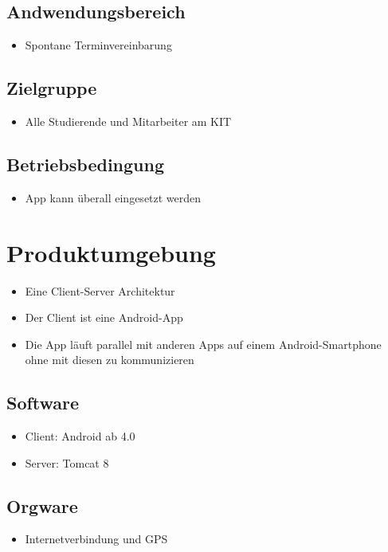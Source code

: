 \documentclass{scrartcl}
\begin{document}
	\subsection{Andwendungsbereich}
		\begin{itemize}	        
		\item Spontane Terminvereinbarung 
		\end{itemize}
		\subsection{Zielgruppe}
		\begin{itemize}	        
		\item Alle Studierende und Mitarbeiter am KIT
		\end{itemize}
		\subsection{Betriebsbedingung}
		\begin{itemize}	        
		\item App kann überall eingesetzt werden
		\end{itemize}

	\newpage
	

	\section{Produktumgebung}
	\begin{itemize}	        
		\item Eine Client-Server Architektur
		\item Der Client ist eine Android-App
		\item Die App läuft parallel mit anderen Apps auf einem Android-Smartphone ohne mit diesen zu kommunizieren
		\end{itemize}
\subsection{Software}
		\begin{itemize}	        
		\item Client: Android ab 4.0
		\item Server: Tomcat 8
		\end{itemize}	
\subsection{Orgware}
		\begin{itemize}	        
		\item Internetverbindung und GPS
		\end{itemize}
\end{document}
